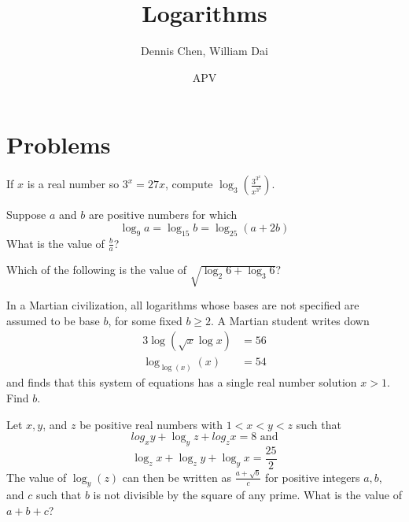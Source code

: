 \documentclass{article}
\title{Logarithms}
\author{Dennis Chen, William Dai}
\date{APV}
\begin{document}
\maketitle



\pagebreak

\section{Problems}



\begin{prob}[PUMaC 2019]{3}
If $x$ is a real number so $3^x = 27x$, compute $\log_{3}(\frac{3^{3^x}}{x^{3^{3}}})$.
\end{prob}

\begin{prob}[MA$\theta$ 1992]{4}
Suppose $a$ and $b$ are positive numbers for which
 $$\log_{9} a  =\log_{15} b =\log_{25}(a+2b)$$
What is the value of $\frac{b}{a}$?
\end{prob}

\begin{req}[AMC 12B 2020/13]{4}
Which of the following is the value of $\sqrt{\log_2{6}+\log_3{6}}?$

\end{req}

\begin{prob}[AIME II 2019/6]{4}
In a Martian civilization, all logarithms whose bases are not specified are assumed to be base $b$, for some fixed $b \geq 2$. A Martian student writes down\begin{align*}3 \log(\sqrt{x}\log x) &= 56\\\log_{\log (x)}(x) &= 54\end{align*}and finds that this system of equations has a single real number solution $x > 1$. Find $b$.
\end{prob}

\begin{prob}{4}
Let $x, y$, and $z$ be positive real numbers with $1 < x < y < z$ such that
$$log_{x} y + \log_{y}z + log_{z}x = 8 \text{ and}$$
$$\log_{z}x + \log_{z}y + \log_{y}x =\frac{25}{2}$$
The value of $\log_{y}(z)$ can then be written as $\frac{a+\sqrt{b}}{c}$ for positive integers $a, b$, and $c$ such that $b$ is not divisible by the square of any prime. What is the value of
$a + b + c$?
\end{prob}
\end{document}
